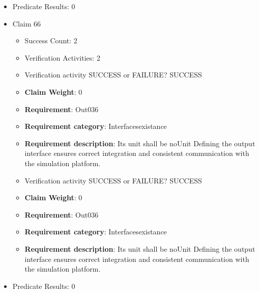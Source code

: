 \documentclass{article}
\begin{document}
\begin{itemize}
\begin{itemize}
					\item Verification activity SUCCESS or FAILURE? SUCCESS
					\item \textbf{Claim Weight}: 0
						\item \textbf{Requirement}: Out035 
						\item \textbf{Requirement category}: Interfacesexistance 
						\item \textbf{Requirement description}: Its unit shall be noUnit Defining the output interface ensures correct integration and consistent communication with the simulation platform.
					
				\end{itemize}
				
									    
				\item Predicate Results: 0

  				  \item Claim 66
				\begin{itemize}
			    	\item Success Count: 2 
			    	\item Verification Activities: 2
					\item Verification activity SUCCESS or FAILURE? SUCCESS
					\item \textbf{Claim Weight}: 0
						\item \textbf{Requirement}: Out036 
						\item \textbf{Requirement category}: Interfacesexistance 
						\item \textbf{Requirement description}: Its unit shall be noUnit Defining the output interface ensures correct integration and consistent communication with the simulation platform.
					
					\item Verification activity SUCCESS or FAILURE? SUCCESS
					\item \textbf{Claim Weight}: 0
						\item \textbf{Requirement}: Out036 
						\item \textbf{Requirement category}: Interfacesexistance 
						\item \textbf{Requirement description}: Its unit shall be noUnit Defining the output interface ensures correct integration and consistent communication with the simulation platform.
					
				\end{itemize}
				
									    
				\item Predicate Results: 0


\end{itemize}
\end{document}

